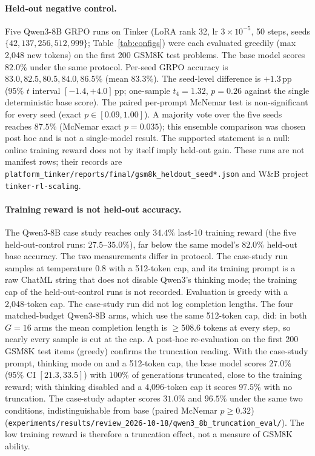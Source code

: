 \documentclass{article}
\begin{document}
\paragraph{Held-out negative control.}
Five Qwen3-8B GRPO runs on Tinker (LoRA rank 32, lr $3{\times}10^{-5}$, 50
steps, seeds $\{42,137,256,512,999\}$; Table~\ref{tab:configs}) were each
evaluated greedily (max 2{,}048 new tokens) on the first 200 GSM8K test
problems. The base model scores $82.0\%$ under the same protocol. Per-seed GRPO
accuracy is $83.0, 82.5, 80.5, 84.0, 86.5\%$ (mean $83.3\%$). The seed-level
difference is $+1.3$\,pp (95\% $t$ interval $[-1.4,+4.0]$\,pp; one-sample
$t_4{=}1.32$, $p{=}0.26$ against the single deterministic base score). The
paired per-prompt McNemar test is non-significant for every seed (exact
$p\in[0.09,1.00]$). A majority vote over the five seeds reaches $87.5\%$
(McNemar exact $p{=}0.035$); this ensemble comparison was chosen post hoc and
is not a single-model result. The supported statement is a null: online
training reward does not by itself imply held-out gain. These runs are not
manifest rows; their records are \texttt{platform\_tinker/reports/final/gsm8k\_heldout\_seed*.json}
and W\&B project \texttt{tinker-rl-scaling}.

\paragraph{Training reward is not held-out accuracy.}
The Qwen3-8B case study reaches only $34.4\%$ last-10 training reward
(the five held-out-control runs: $27.5$--$35.0\%$), far below the same model's
$82.0\%$ held-out base accuracy. The two measurements differ in protocol. The
case-study run samples at temperature 0.8 with a 512-token cap, and its
training prompt is a raw ChatML string that does not disable Qwen3's thinking
mode; the training cap of the held-out-control runs is not recorded.
Evaluation is greedy with a 2{,}048-token cap.
The case-study run did not log completion lengths. The four matched-budget
Qwen3-8B arms, which use the same 512-token cap, did: in both $G{=}16$ arms the
mean completion length is $\ge508.6$ tokens at every step, so nearly every
sample is cut at the cap. A post-hoc re-evaluation on the first 200 GSM8K test
items (greedy) confirms the truncation reading. With the case-study prompt,
thinking mode on and a 512-token cap, the base model scores $27.0\%$
(95\% CI $[21.3, 33.5]$) with $100\%$ of generations truncated, close to the
training reward; with thinking disabled and a 4{,}096-token cap it scores
$97.5\%$ with no truncation. The case-study adapter scores $31.0\%$ and
$96.5\%$ under the same two conditions, indistinguishable from base (paired
McNemar $p\ge0.32$)
(\nolinkurl{experiments/results/review_2026-10-18/qwen3_8b_truncation_eval/}).
The low training reward is therefore a truncation effect, not a measure of
GSM8K ability.
\end{document}
